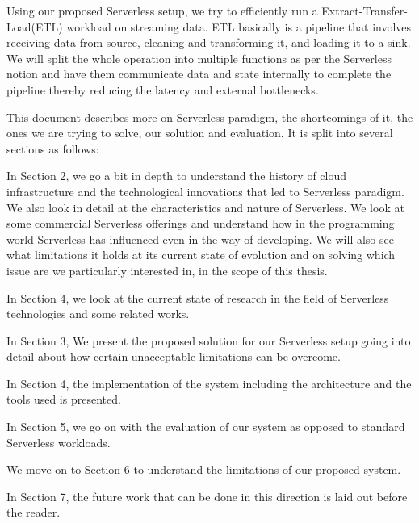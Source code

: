 \documentclass[12pt,titlepage]{article}
\begin{document}
Using our proposed Serverless setup, we try to efficiently run a
Extract-Transfer-Load(ETL) workload on streaming data. ETL basically is a pipeline that involves receiving data
from source, cleaning and transforming it, and loading it to a sink. We will
split the whole operation into multiple functions as per the Serverless notion
and have them communicate data and state internally to complete the pipeline
thereby reducing the latency and external bottlenecks.

This document describes more on Serverless paradigm, the shortcomings of it, the
ones we are trying to solve, our solution and evaluation. It is split into
several sections as follows:

In Section 2, we go a bit in depth to understand the history of cloud
infrastructure and the technological innovations that led to Serverless
paradigm. We also look in detail at the characteristics and nature of
Serverless. We look at some commercial Serverless offerings and understand how
in the programming world Serverless has influenced even in the way of developing.
We will also see what limitations it holds at its current state of evolution and
on solving which issue are we particularly interested in, in the scope of this
thesis.

In Section 4, we look at the current state of research in the field of
Serverless technologies and some related works.

In Section 3, We present the proposed solution for our Serverless setup going
into detail about how certain unacceptable limitations can be overcome.

In Section 4, the implementation of the system including the architecture and
the tools used is presented.

In Section 5, we go on with the evaluation of our system as opposed to standard
Serverless workloads.

We move on to Section 6 to understand the limitations of our proposed system.

In Section 7, the future work that can be done in this direction is laid out
before the reader.
\end{document}
